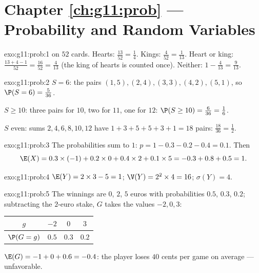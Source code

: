 \section*{Chapter \ref{ch:g11:prob} --- Probability and Random Variables}

\begin{solution}{exo:g11:prob:1}
 on $52$ cards. Hearts: $\frac{13}{52} = \frac14$. Kings:
$\frac{4}{52} = \frac{1}{13}$. Heart or king:
$\frac{13 + 4 - 1}{52} = \frac{16}{52} = \frac{4}{13}$ (the king of
hearts is counted once). Neither: $1 - \frac{4}{13} = \frac{9}{13}$.
\end{solution}

\begin{solution}{exo:g11:prob:2}
$S = 6$: the pairs $(1,5), (2,4), (3,3), (4,2), (5,1)$, so
$\P(S = 6) = \frac{5}{36}$.

$S \geq 10$: three pairs for $10$, two for $11$, one for $12$:
$\P(S \geq 10) = \frac{6}{36} = \frac16$.

$S$ even: sums $2, 4, 6, 8, 10, 12$ have $1 + 3 + 5 + 5 + 3 + 1 = 18$
pairs:  $\frac{18}{36} = \frac12$.
\end{solution}

\begin{solution}{exo:g11:prob:3}
The probabilities sum to $1$: $p = 1 - 0.3 - 0.2 - 0.4 = 0.1$. Then
\[
\E(X) = 0.3 \times (-1) + 0.2 \times 0 + 0.4 \times 2 + 0.1 \times 5
= -0.3 + 0.8 + 0.5 = 1 .
\]
\end{solution}

\begin{solution}{exo:g11:prob:4}
$\E(Y) = 2 \times 3 - 5 = 1$; $\V(Y) = 2^2 \times 4 = 16$;
$\sigma(Y) = 4$.
\end{solution}

\begin{solution}{exo:g11:prob:5}
The winnings are $0$, $2$, $5$ euros with probabilities $0.5$, $0.3$,
$0.2$; subtracting the $2$-euro stake, $G$ takes the values $-2, 0, 3$:
\begin{center}
\begin{tabular}{c|ccc}
$g$ & $-2$ & $0$ & $3$\\
\hline
$\P(G=g)$ & $0.5$ & $0.3$ & $0.2$
\end{tabular}
\end{center}
$\E(G) = -1 + 0 + 0.6 = -0.4$: the player loses $40$ cents per game on
average --- unfavorable.
\end{solution}

